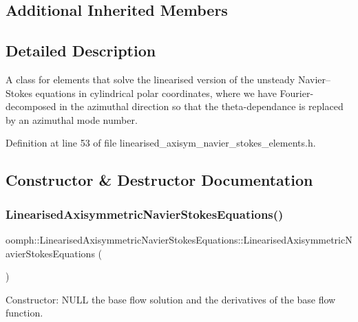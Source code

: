 \subsection*{Additional Inherited Members}


\subsection{Detailed Description}
A class for elements that solve the linearised version of the unsteady Navier--Stokes equations in cylindrical polar coordinates, where we have Fourier-\/decomposed in the azimuthal direction so that the theta-\/dependance is replaced by an azimuthal mode number. 

Definition at line 53 of file linearised\+\_\+axisym\+\_\+navier\+\_\+stokes\+\_\+elements.\+h.



\subsection{Constructor \& Destructor Documentation}
\mbox{\label{classoomph_1_1LinearisedAxisymmetricNavierStokesEquations_af5e187cebf7b218c452eeaef0514abfb}} 
\subsubsection{\texorpdfstring{Linearised\+Axisymmetric\+Navier\+Stokes\+Equations()}{LinearisedAxisymmetricNavierStokesEquations()}}
{\footnotesize\ttfamily oomph\+::\+Linearised\+Axisymmetric\+Navier\+Stokes\+Equations\+::\+Linearised\+Axisymmetric\+Navier\+Stokes\+Equations (\begin{DoxyParamCaption}{ }\end{DoxyParamCaption})\hspace{0.3cm}{\ttfamily [inline]}}



Constructor\+: N\+U\+LL the base flow solution and the derivatives of the base flow function. 




